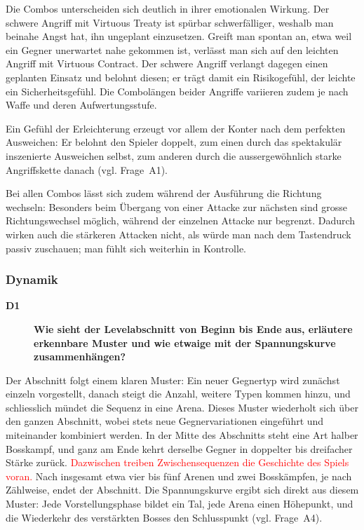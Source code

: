 \documentclass[../Main.tex]{subfiles}
\begin{document}
\begingroup\color{red}Die Combos unterscheiden sich deutlich in ihrer emotionalen Wirkung. Der schwere Angriff mit Virtuous Treaty ist spürbar schwerfälliger, weshalb man beinahe Angst hat, ihn ungeplant einzusetzen. Greift man spontan an, etwa weil ein Gegner unerwartet nahe gekommen ist, verlässt man sich auf den leichten Angriff mit Virtuous Contract. Der schwere Angriff verlangt dagegen einen geplanten Einsatz und belohnt diesen; er trägt damit ein Risikogefühl, der leichte ein Sicherheitsgefühl. Die Combolängen beider Angriffe variieren zudem je nach Waffe und deren Aufwertungsstufe.

Ein Gefühl der Erleichterung erzeugt vor allem der Konter nach dem perfekten Ausweichen: Er belohnt den Spieler doppelt, zum einen durch das spektakulär inszenierte Ausweichen selbst, zum anderen durch die aussergewöhnlich starke Angriffskette danach (vgl. Frage~A1).

Bei allen Combos lässt sich zudem während der Ausführung die Richtung wechseln: Besonders beim Übergang von einer Attacke zur nächsten sind grosse Richtungswechsel möglich, während der einzelnen Attacke nur begrenzt. Dadurch wirken auch die stärkeren Attacken nicht, als würde man nach dem Tastendruck passiv zuschauen; man fühlt sich weiterhin in Kontrolle.\endgroup

\subsubsection{Dynamik}

\begin{description}
    \item[\textbf{D1}] \textbf{Wie sieht der Levelabschnitt von Beginn bis Ende aus, erläutere erkennbare Muster und wie etwaige mit der Spannungskurve zusammenhängen?}
\end{description}

Der Abschnitt folgt einem klaren Muster: Ein neuer Gegnertyp wird zunächst einzeln vorgestellt, danach steigt die Anzahl, weitere Typen kommen hinzu, und schliesslich mündet die Sequenz in eine Arena. Dieses Muster wiederholt sich über den ganzen Abschnitt, wobei stets neue Gegnervariationen eingeführt und miteinander kombiniert werden. In der Mitte des Abschnitts steht eine Art halber Bosskampf, und ganz am Ende kehrt derselbe Gegner in doppelter bis dreifacher Stärke zurück. \textcolor{red}{Dazwischen treiben Zwischensequenzen die Geschichte des Spiels voran.} Nach insgesamt etwa vier bis fünf Arenen und zwei Bosskämpfen, je nach Zählweise, endet der Abschnitt. Die Spannungskurve ergibt sich direkt aus diesem Muster: Jede Vorstellungsphase bildet ein Tal, jede Arena einen Höhepunkt, und die Wiederkehr des verstärkten Bosses den Schlusspunkt (vgl. Frage~A4).
\end{document}

